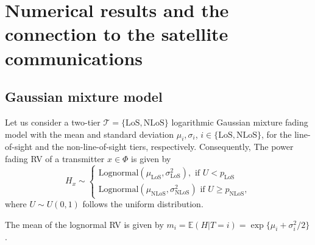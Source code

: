 \documentclass[lettersize,journal]{IEEEtran}
\begin{document}
\section{Numerical results and the connection to the satellite communications}




\subsection{Gaussian mixture model}
Let us consider a two-tier $\mathcal{T} = \{\text{LoS},\text{NLoS}\}$ logarithmic Gaussian mixture fading model with the mean and standard deviation $\mu_{i},\sigma_{i}$, $i \in \{\text{LoS},\text{NLoS} \}$, for the line-of-sight and the non-line-of-sight tiers, respectively. Consequently, The power fading RV of a transmitter $x \in \Phi$ is given by
\begin{equation}
  H_x \sim
  \begin{cases}
    \text{Lognormal}(\mu_{\text{LoS}},\sigma_{\text{LoS}}^2), \text{ if } U<p_{\text{LoS}} \\
    \text{Lognormal}(\mu_{\text{NLoS}},\sigma_{\text{NLoS}}^2)\text{ if } U \geq p_{\text{NLoS}},              \label{eq:tier2lognormal}
  \end{cases}
\end{equation}
where $U \sim U(0,1)$ follows the uniform distribution.







The mean of the lognormal RV is given by $ m_i=\mathbb{E}(H|T=i) = \exp \{\mu_i+\sigma_i^2/2\}$.


\end{document}
